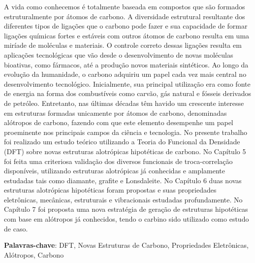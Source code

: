 \documentclass[
	12pt,				%
	openright,			%
	twoside,			%
	a4paper,			%
	chapter=TITLE,		%
	english,			%
	french,				%
	spanish,			%
	brazil				%
	]{abntex2}
\begin{document}
\setlength{\absparsep}{18pt} %
\begin{resumo}
	
	A vida como conhecemos é totalmente baseada em compostos que são formados estruturalmente por átomos de carbono. A diversidade estrutural resultante dos diferentes tipos de ligações que o carbono pode fazer e sua capacidade de formar ligações químicas fortes e estáveis com outros átomos de carbono resulta em uma miríade de moléculas e materiais. O controle correto dessas ligações resulta em aplicações tecnológicas que vão desde o desenvolvimento de novas moléculas bioativas, como fármacos, até a produção novos materiais sintéticos. 	
	Ao longo da evolução da humanidade, o carbono adquiriu um papel cada vez mais central no desenvolvimento tecnológico. Inicialmente, sua principal utilização era como fonte de energia na forma dos combustíveis como carvão, gás natural e fósseis derivados de petróleo. Entretanto, nas últimas décadas têm havido um crescente interesse em estruturas formadas unicamente por átomos de carbono, denominadas alótropos de carbono, fazendo com que este elemento desempenhe um papel proeminente nos principais campos da ciência e tecnologia. 	
	No presente trabalho foi realizado um estudo teórico utilizando a Teoria do Funcional da Densidade (DFT) sobre novas estruturas alotrópicas hipotéticas de carbono. No Capítulo 5 foi feita uma criteriosa validação dos diversos funcionais de troca-correlação disponíveis, utilizando estruturas alotrópicas já conhecidas e amplamente estudadas tais como diamante, grafite e Lonsdaleite. No Capítulo 6 duas novas estruturas alotrópicas hipotéticas foram propostas e suas propriedades eletrônicas, mecânicas, estruturais e vibracionais estudadas profundamente. No Capítulo 7 foi proposta uma nova estratégia de geração de estruturas hipotéticas com base em alótropos já conhecidos, tendo o carbino sido utilizado como estudo de caso. 

 \textbf{Palavras-chave}: DFT, Novas Estruturas de Carbono, Propriedades Eletrônicas, Alótropos, Carbono
\end{resumo}
\end{document}
